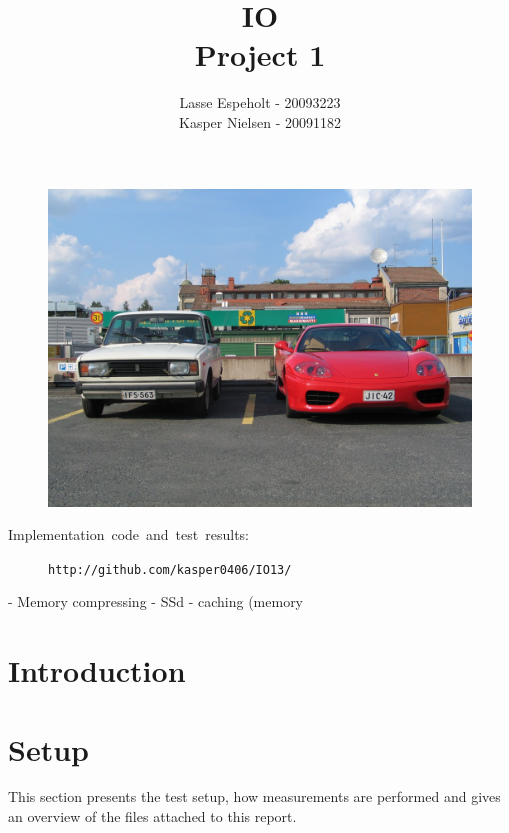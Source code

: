 \documentclass[a4paper,12pt]{article}
\begin{document}
\title{IO\\Project 1}

\author{Lasse Espeholt - 20093223\\
Kasper Nielsen - 20091182\\}

\maketitle
\begin{figure}[h!]
\includegraphics[width=\textwidth]{"images/forside"}
\end{figure}


\vfill{}
\begin{description}
\item [{Implementation~code~and~test~results:}]
\texttt{http://github.com/kasper0406/IO13/}
\end{description}
\pagebreak{}\tableofcontents{}\pagebreak{}

- Memory compressing
- SSd
- caching (memory

\section{Introduction}


\section{Setup}
This section presents the test setup, how measurements are performed
and gives an overview of the files attached to this report.
\end{document}
